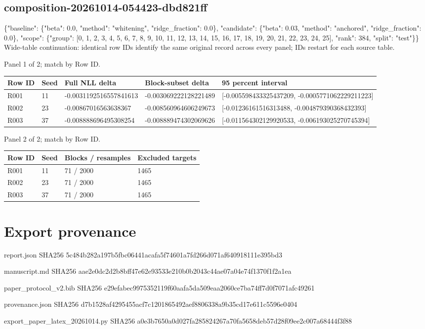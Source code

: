 \documentclass[10pt]{article}
\begin{document}
\subsection{composition-20261014-054423-dbd821ff}
\{"baseline": \{"beta": 0.0, "method": "whitening", "ridge\_fraction": 0.0\}, "candidate": \{"beta": 0.03, "method": "anchored", "ridge\_fraction": 0.0\}, "scope": \{"group": [0, 1, 2, 3, 4, 5, 6, 7, 8, 9, 10, 11, 12, 13, 14, 15, 16, 17, 18, 19, 20, 21, 22, 23, 24, 25], "rank": 384, "split": "test"\}\}
Wide-table continuation: identical row IDs identify the same original record across every panel; IDs restart for each source table.
\par\noindent Panel 1 of 2; match by Row ID.
{\scriptsize\setlength{\tabcolsep}{2pt}
\begin{longtable}{p{}p{}p{}p{}p{}}
Row ID & Seed & Full NLL delta & Block-subset delta & 95 percent interval \\
\hline\endhead
R001 & 11 & -0.0031192516557841613 & -0.003069222128221489 & [-0.005598433325437209, -0.0005771062229211223] \\
R002 & 23 & -0.00867016563638367 & -0.008560964606249673 & [-0.01236161516313488, -0.004879390368432393] \\
R003 & 37 & -0.008888696495308254 & -0.008889474302069626 & [-0.011564302129920533, -0.006193025270745394] \\
\end{longtable}}
\par\noindent Panel 2 of 2; match by Row ID.
{\scriptsize\setlength{\tabcolsep}{2pt}
\begin{longtable}{p{}p{}p{}p{}}
Row ID & Seed & Blocks / resamples & Excluded targets \\
\hline\endhead
R001 & 11 & 71 / 2000 & 1465 \\
R002 & 23 & 71 / 2000 & 1465 \\
R003 & 37 & 71 / 2000 & 1465 \\
\end{longtable}}
\section{Export provenance}
\par\noindent\small report.json SHA256 5c484b282a197b5fbc06441acafa5f74601a7fd266d071af640918111e395bd3
\par\noindent\small manuscript.md SHA256 aae2e0dc2d2b8bff47e62e93533e210b0b2043c44ae07a04e74f1370f1f2a1ea
\par\noindent\small paper\_protocol\_v2.bib SHA256 e29efabec9975352119f60aafa5da509eaa2060ce7ba74ff7d0f7071afc49261
\par\noindent\small provenance.json SHA256 d7b1528af4295455acf7c1201865492aef8806338a9b35cd17e611c5596e0404
\par\noindent\small export\_paper\_latex\_20261014.py SHA256 a0e3b7650a0d027fa285824267a70fa5658deb57d28f09ee2c007a68444f3f88
\end{document}
